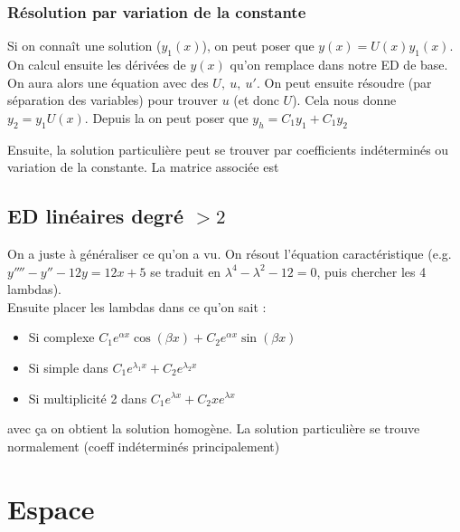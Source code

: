 \documentclass[12pt,a4paper]{article}
\renewcommand{\)}{\right)}
\renewcommand{\(}{\left(}
\begin{document}
\subsubsection{Résolution par variation de la constante}
Si on connaît une solution ($y_1(x)$), on peut poser que $y(x) = U(x)y_1(x)$. On calcul ensuite les dérivées de $y(x)$ qu'on remplace dans notre ED de base. On aura alors une équation avec des $U,\ u,\ u'$. On peut ensuite résoudre (par séparation des variables) pour trouver $u$ (et donc $U$). Cela nous donne $y_2 = y_1 U(x)$. Depuis la on peut poser que $y_h = C_1y_1 + C_1y_2$

Ensuite, la solution particulière peut se trouver par coefficients indéterminés ou variation de la constante. La matrice associée est 

\subsection{ED linéaires degré $> 2$}
On a juste à généraliser ce qu'on a vu. On résout l'équation caractéristique (e.g. $y'''' - y'' - 12y = 12x + 5$ se traduit en $\lambda^4 - \lambda^2 - 12 = 0$, puis chercher les 4 lambdas).\\
Ensuite placer les lambdas dans ce qu'on sait :
\begin{itemize}
	\item Si complexe $C_1e^{\alpha x}\cos(\beta x) + C_2e^{\alpha x}\sin(\beta x)$
	\item Si simple dans $C_1e^{\lambda_1 x} + C_2e^{\lambda_2 x}$
	\item Si multiplicité 2 dans $C_1e^{\lambda x} + C_2xe^{\lambda x}$	
\end{itemize}
avec ça on obtient la solution homogène. La solution particulière se trouve normalement (coeff indéterminés principalement)

\section{Espace \rn}
\end{document}
